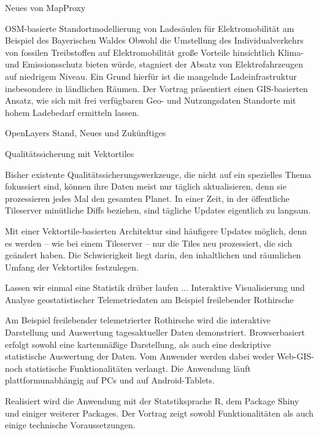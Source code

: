 %
{Neues von MapProxy}%
{}%
{}

%
{OSM-basierte Standortmodellierung von Ladesäulen für Elektromobilität am Beispiel des Bayerischen Waldes}%
{}%
{Obwohl die Umstellung des Individualverkehrs von fossilen Treibstoffen auf Elektromobilität große
Vorteile hinsichtlich Klima- und Emissionsschutz bieten würde, stagniert der Absatz von
Elektrofahrzeugen auf niedrigem Niveau. Ein Grund hierfür ist die mangelnde Ladeinfrastruktur
insbesondere in ländlichen Räumen. Der Vortrag präsentiert einen GIS-basierten Ansatz, wie sich mit
frei verfügbaren Geo- und Nutzungsdaten Standorte mit hohem Ladebedarf ermitteln lassen.}

%
{OpenLayers}%
{Stand, Neues und Zukünftiges}%
{}

%
{Qualitätssicherung mit Vektortiles}%
{}%
{Bisher existente Qualitätssicherungswerkzeuge, die nicht auf ein spezielles Thema fokussiert sind,
  können ihre Daten meist nur täglich aktualisieren, denn sie prozessieren jedes Mal den gesamten
  Planet. In einer Zeit, in der öffentliche Tileserver minütliche Diffs beziehen, sind tägliche
  Updates eigentlich zu langsam.

Mit einer Vektortile-basierten Architektur sind häufigere Updates möglich, denn es werden – wie bei
einem Tileserver – nur die Tiles neu prozessiert, die sich geändert haben. Die Schwierigkeit liegt
darin, den inhaltlichen und räumlichen Umfang der Vektortiles festzulegen.}

%
{Lassen wir einmal eine Statistik drüber laufen ...}%
{Interaktive Visualisierung und Analyse geostatistischer Telemetriedaten am Beispiel freilebender Rothirsche}%
{Am Beispiel freilebender telemetrierter Rothirsche wird die interaktive Darstellung und Auswertung
  tagesaktueller Daten demonstriert. Browserbasiert erfolgt sowohl eine kartenmäßige Darstellung,
  als auch eine deskriptive statistische Auswertung der Daten. Vom Anwender werden dabei weder
  Web-GIS- noch statistische Funktionalitäten verlangt. Die Anwendung läuft plattformunabhängig auf
  PCs und auf Android-Tablets.

Realisiert wird die Anwendung mit der Statstiksprache R, dem Package Shiny und einiger weiterer
Packages. Der Vortrag zeigt sowohl Funktionalitäten als auch einige technische Voraussetzungen.}

